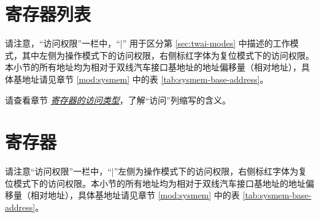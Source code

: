 \documentclass[main\_\_CN.tex]{subfiles}
\begin{document}


\clearpage
\section{寄存器列表}
\label{sec:twai-reg-summ}
\hypertarget{twai-reg-summ}{}

请注意，“访问权限”一栏中，“|” 用于区分第 \ref{sec:twai-modes} 中描述的工作模式，其中左侧为操作模式下的访问权限，右侧标红字体为复位模式下的访问权限。本小节的所有地址均为相对于双线汽车接口基地址的地址偏移量（相对地址），具体基地址请见章节 \ref{mod:sysmem} \textit{} 中的表 \ref{tab:sysmem-base-address}。

请查看章节 \hyperref[glossary-access-types]{\textit{寄存器的访问类型}}，了解“访问”列缩写的含义。






\clearpage
\section{寄存器}

请注意“访问权限”一栏中，“|”左侧为操作模式下的访问权限，右侧标红字体为复位模式下的访问权限。本小节的所有地址均为相对于双线汽车接口基地址的地址偏移量（相对地址），具体基地址请见章节 \ref{mod:sysmem} \textit{} 中的表 \ref{tab:sysmem-base-address}。


\end{document}
